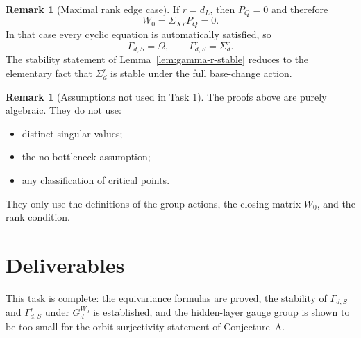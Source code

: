 \documentclass{article}
\theoremstyle{definition}
\newtheorem{remark}[theorem]{Remark}
\begin{document}
\begin{remark}[Maximal rank edge case]
If $r=d_L$, then $P_Q=0$ and therefore
\[
W_0=\Sigma_{XY}P_Q=0.
\]
In that case every cyclic equation is automatically satisfied, so
\[
\Gamma_{d,S}=\Omega,
\qquad
\Gamma_{d,S}^r=\Sigma_d^r.
\]
The stability statement of Lemma~\ref{lem:gamma-r-stable} reduces to the elementary fact that $\Sigma_d^r$ is stable under the full base-change action.
\end{remark}

\begin{remark}[Assumptions not used in Task 1]
The proofs above are purely algebraic. They do not use:
\begin{itemize}
\item distinct singular values;
\item the no-bottleneck assumption;
\item any classification of critical points.
\end{itemize}
They only use the definitions of the group actions, the closing matrix $W_0$, and the rank condition.
\end{remark}

\section{Deliverables}

This task is complete: the equivariance formulas are proved, the stability of $\Gamma_{d,S}$ and $\Gamma_{d,S}^r$ under $G_d^{W_0}$ is established, and the hidden-layer gauge group is shown to be too small for the orbit-surjectivity statement of Conjecture~A.
\end{document}
